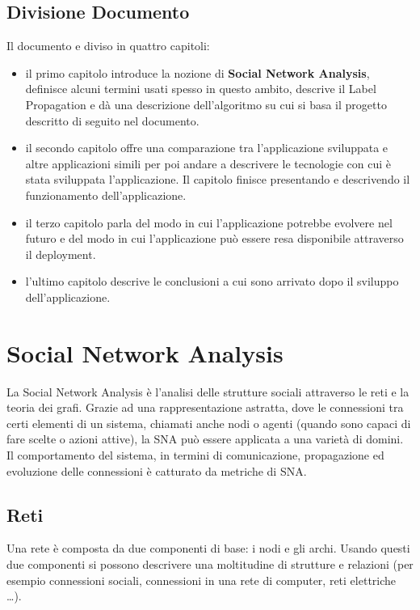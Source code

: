 \documentclass[a4paper,12pt]{report}
\begin{document}
\section{Divisione Documento}
Il documento e diviso in quattro capitoli:
\begin{itemize}
\item il primo capitolo introduce la nozione di \textbf{Social Network Analysis}, definisce alcuni termini usati spesso in questo ambito, descrive il Label Propagation e dà una descrizione dell'algoritmo su cui si basa il progetto descritto di seguito nel documento.

\item il secondo capitolo offre una comparazione tra l'applicazione sviluppata e altre applicazioni simili per poi andare a descrivere le tecnologie con cui è stata sviluppata l'applicazione. Il capitolo finisce presentando e descrivendo il funzionamento dell'applicazione.

\item il terzo capitolo parla del modo in cui l'applicazione potrebbe evolvere nel futuro e del modo in cui l'applicazione può essere resa disponibile attraverso il deployment.

\item l'ultimo capitolo descrive le conclusioni a cui sono arrivato dopo il sviluppo dell'applicazione.

\end{itemize}
%

\chapter{Social Network Analysis}
	La Social Network Analysis è l'analisi delle strutture sociali attraverso le reti e la teoria dei grafi. \cite{snaintro}
	Grazie ad una rappresentazione astratta, dove le connessioni tra certi elementi di un sistema, chiamati anche nodi o agenti (quando sono capaci di fare scelte o azioni attive), la SNA può essere applicata a una varietà di domini. Il comportamento del sistema, in termini di comunicazione, propagazione ed evoluzione delle connessioni è catturato da metriche di SNA. \cite{avpra}

	\section{Reti}
	Una rete è composta da due componenti di base: i nodi e gli archi. Usando questi due componenti si possono descrivere una moltitudine di strutture e relazioni (per esempio connessioni sociali, connessioni in una rete di computer, reti elettriche \dots). 
\end{document}
